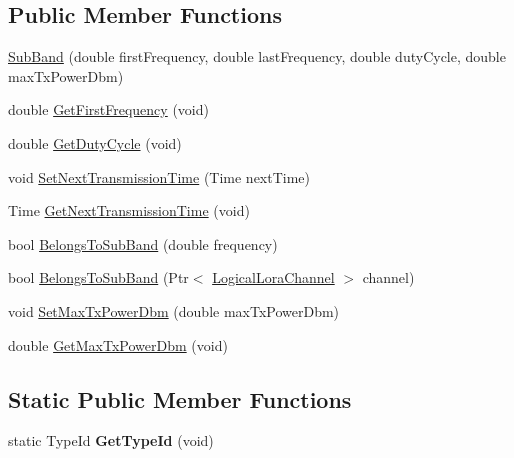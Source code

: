 \subsection*{Public Member Functions}
\begin{DoxyCompactItemize}
\item 
\hyperlink{classns3_1_1lorawan_1_1SubBand_ae4b384695f2aa059cb9b58121ad92190}{Sub\+Band} (double first\+Frequency, double last\+Frequency, double duty\+Cycle, double max\+Tx\+Power\+Dbm)
\item 
double \hyperlink{classns3_1_1lorawan_1_1SubBand_a56fd6d9c25be89a8c7df74c0c675ae79}{Get\+First\+Frequency} (void)
\item 
double \hyperlink{classns3_1_1lorawan_1_1SubBand_a4777b7540f6ce04df576395823f0d4d2}{Get\+Duty\+Cycle} (void)
\item 
void \hyperlink{classns3_1_1lorawan_1_1SubBand_a5868e39cf48f0a104003cba5c383d6fa}{Set\+Next\+Transmission\+Time} (Time next\+Time)
\item 
Time \hyperlink{classns3_1_1lorawan_1_1SubBand_a5303173d70f98effe8586d34d83172d8}{Get\+Next\+Transmission\+Time} (void)
\item 
bool \hyperlink{classns3_1_1lorawan_1_1SubBand_a2ae058fe3857811e9bf094e64c30fb41}{Belongs\+To\+Sub\+Band} (double frequency)
\item 
bool \hyperlink{classns3_1_1lorawan_1_1SubBand_ae63724cfdd997fb554d076b513637d07}{Belongs\+To\+Sub\+Band} (Ptr$<$ \hyperlink{classns3_1_1lorawan_1_1LogicalLoraChannel}{Logical\+Lora\+Channel} $>$ channel)
\item 
void \hyperlink{classns3_1_1lorawan_1_1SubBand_ae7d62f0bfad6a386b1d7036da38d82b7}{Set\+Max\+Tx\+Power\+Dbm} (double max\+Tx\+Power\+Dbm)
\item 
double \hyperlink{classns3_1_1lorawan_1_1SubBand_ae8a66a1d4c75b67f98c045b906cae2f9}{Get\+Max\+Tx\+Power\+Dbm} (void)
\end{DoxyCompactItemize}
\subsection*{Static Public Member Functions}
\begin{DoxyCompactItemize}
\item 
\mbox{\label{classns3_1_1lorawan_1_1SubBand_a79b51c62431c087ab62d75603d64f704}} 
static Type\+Id {\bfseries Get\+Type\+Id} (void)
\end{DoxyCompactItemize}


